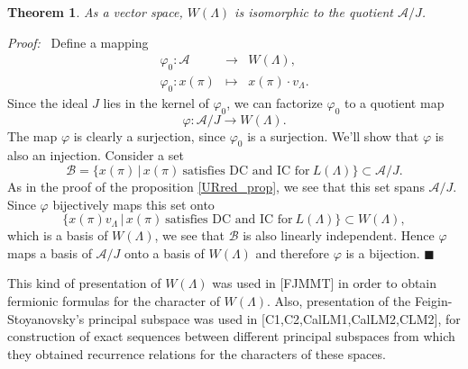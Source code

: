 \documentclass[a4paper, 10pt,oneside]{amsart}
\newtheorem{tm}{Theorem}
\newenvironment{dokaz}
{\noindent\emph{Proof:}\ }
{\hfill $\blacksquare$}
\begin{document}
\begin{tm}
As a vector space, $W(\Lambda)$ is isomorphic to the quotient $\mathcal{A}/J$.
\end{tm}

\begin{dokaz}
Define a mapping
\begin{eqnarray*}
\varphi_0:\mathcal{A} & \to &  W(\Lambda),\\
\varphi_0:x(\pi) & \mapsto & x(\pi)\cdot v_\Lambda.
\end{eqnarray*}
Since the ideal $J$ lies in the kernel of $\varphi_0$, we can factorize $\varphi_0$
to a quotient map
$$
\varphi: \mathcal{A}/J \to  W(\Lambda).
$$ The map $\varphi$ is clearly a surjection, since $\varphi_0$ is
a surjection. We'll show that $\varphi$ is also an injection. Consider a set
$$\mathcal{B}=\{x(\pi)\,|\,x(\pi)\ \textrm{satisfies DC and IC for}\ L(\Lambda)\}\subset \mathcal{A}/J.$$
As in the proof of the proposition \ref{URred_prop}, we see that
this set spans $\mathcal{A}/J$. Since $\varphi$
bijectively maps this set onto
$$\{x(\pi)v_\Lambda\,|\,x(\pi)\ \textrm{satisfies DC and IC for}\ L(\Lambda)\}\subset W(\Lambda),$$
which is a basis of $W(\Lambda)$, we see that $\mathcal{B}$ is also linearly
independent. Hence $\varphi$ maps
a basis of $\mathcal{A}/J$ onto a basis of $W(\Lambda)$ and therefore
 $\varphi$ is a bijection.
\end{dokaz}

This kind of presentation of $W(\Lambda)$ was used in [FJMMT] in
order to obtain fermionic formulas for the character of
$W(\Lambda)$. Also, presentation of the Feigin-Stoyanovsky's
principal subspace was used in [C1,C2,CalLM1,CalLM2,CLM2], for construction of exact sequences between
different principal subspaces from which they obtained recurrence
relations for the characters of these spaces.
\end{document}
